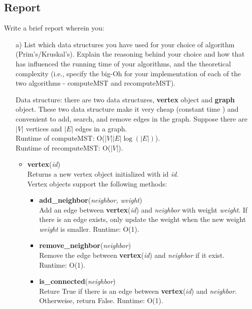 \documentclass{article}
\begin{document}
\subsection{Report}\label{subsec:report}
Write a brief report wherein you:
\begin{itemize}
\item[a)] List which data structures you have used for your choice of algorithm
(Prim's/Kruskal's). Explain the reasoning behind your choice and how that has
influenced the running time of your algorithms, and the theoretical complexity
(i.e., specify the big-Oh for your implementation of each of the two algorithms
- computeMST and recomputeMST).
\begin{tcolorbox}
\noindent Data structure: there are two data structures, \textbf{vertex} object and \textbf{graph} object. These two data structure make it very cheap (constant time ) and convenient to add, search, and remove edges in the graph.  Suppose there are $|V|$ vertices and $|E|$ edges in a graph. \\

\noindent Runtime of computeMST:  O($|V||E|\log(|E|)$). \\
Runtime of recomputeMST: O($|V|$).\\

\begin{itemize}
\item \textbf{vertex}(\textit{id})\\
Returns a new vertex object initialized with id \textit{id}. \\
Vertex objects support the following methods:
\begin{itemize}
\item \textbf{add\_neighbor}(\textit{neighbor, weight})\\
 Add an edge between \textbf{vertex}(\textit{id}) and  \textit{neighbor} with weight \textit{weight}. If there is an edge exists, only update the weight when the new weight \textit{weight} is smaller. Runtime: O(1).
 
\item \textbf{remove\_neighbor}(\textit{neighbor})\\
Remove the edge between \textbf{vertex}(\textit{id}) and  \textit{neighbor} if it exist. Runtime: O(1).

\item \textbf{is\_connected}(\textit{neighbor})\\
Reture True if there is an edge between \textbf{vertex}(\textit{id}) and  \textit{neighbor}. Otherweise, return False. Runtime: O(1).


\end{itemize}
\end{itemize}
\end{tcolorbox}
\end{itemize}
\end{document}
